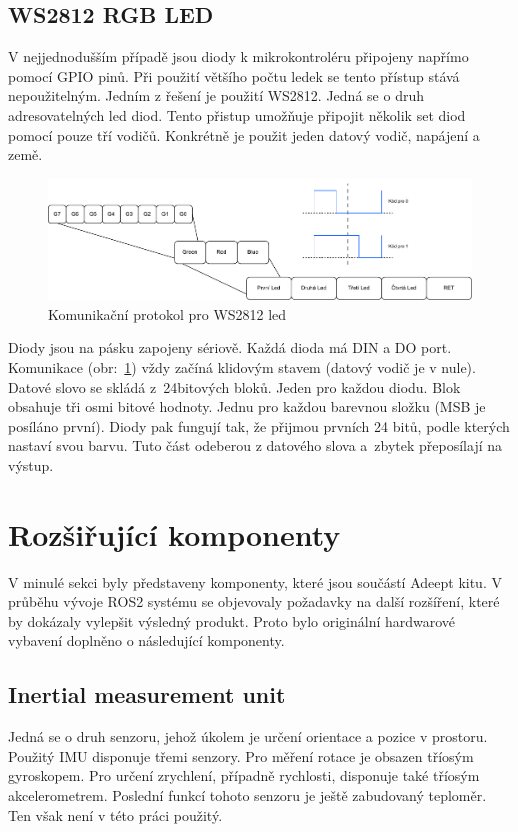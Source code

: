 \subsection*{WS2812 RGB LED}
V nejjednodušším případě jsou diody k mikrokontroléru připojeny napřímo pomocí GPIO pinů. Při použití většího počtu ledek se tento přístup stává nepoužitelným. Jedním z řešení je použití WS2812. Jedná se o druh adresovatelných led diod. Tento přistup umožňuje připojit několik set diod pomocí pouze tří vodičů. Konkrétně je použit jeden datový vodič, napájení a země. \cite[str:~2]{ws2812}

\begin{figure}[h!]
	\centering
	\includegraphics[scale=0.6]{obrazky-figures/ws2812_led.pdf}
	\caption{Komunikační protokol pro WS2812 led}
	\label{fig:ws2812_protocol}
\end{figure}

Diody jsou na pásku zapojeny sériově. Každá dioda má DIN a DO port. Komunikace (obr:~\ref{fig:ws2812_protocol}) vždy začíná klidovým stavem (datový vodič je v nule). Datové slovo se skládá z~24bitových bloků. Jeden pro každou diodu. Blok obsahuje tři osmi bitové hodnoty. Jednu pro každou barevnou složku (MSB je posíláno první). Diody pak fungují tak, že přijmou prvních 24 bitů, podle kterých nastaví svou barvu. Tuto část odeberou z datového slova a~zbytek přeposílají na výstup. \cite[str:~4]{ws2812}

\section{Rozšiřující komponenty}
V minulé sekci byly představeny komponenty, které jsou součástí Adeept kitu. V průběhu vývoje ROS2 systému se objevovaly požadavky na další rozšíření, které by dokázaly vylepšit výsledný produkt. Proto bylo originální hardwarové vybavení doplněno o následující komponenty.

\subsection*{Inertial measurement unit}
Jedná se o druh senzoru, jehož úkolem je určení orientace a pozice v prostoru. Použitý IMU disponuje třemi senzory. Pro měření rotace je obsazen tříosým gyroskopem. Pro určení zrychlení, případně rychlosti, disponuje také tříosým akcelerometrem. Poslední funkcí tohoto senzoru je ještě zabudovaný teploměr. Ten však není v této práci použitý.

